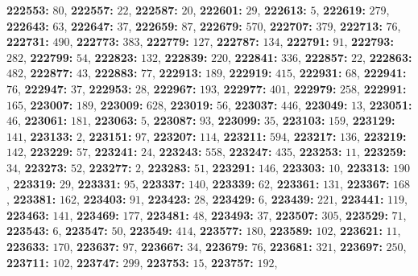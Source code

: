 \textsf{\bfseries 222553:} $80$, \textsf{\bfseries 222557:} $22$, \textsf{\bfseries 222587:} $20$, \textsf{\bfseries 222601:} $29$, \textsf{\bfseries 222613:} $5$, \textsf{\bfseries 222619:} $279$, \textsf{\bfseries 222643:} $63$, \textsf{\bfseries 222647:} $37$, \textsf{\bfseries 222659:} $87$, \textsf{\bfseries 222679:} $570$, \textsf{\bfseries 222707:} $379$, \textsf{\bfseries 222713:} $76$, \textsf{\bfseries 222731:} $490$, \textsf{\bfseries 222773:} $383$, \textsf{\bfseries 222779:} $127$, \textsf{\bfseries 222787:} $134$, \textsf{\bfseries 222791:} $91$, \textsf{\bfseries 222793:} $282$, \textsf{\bfseries 222799:} $54$, \textsf{\bfseries 222823:} $132$, \textsf{\bfseries 222839:} $220$, \textsf{\bfseries 222841:} $336$, \textsf{\bfseries 222857:} $22$, \textsf{\bfseries 222863:} $482$, \textsf{\bfseries 222877:} $43$, \textsf{\bfseries 222883:} $77$, \textsf{\bfseries 222913:} $189$, \textsf{\bfseries 222919:} $415$, \textsf{\bfseries 222931:} $68$, \textsf{\bfseries 222941:} $76$, \textsf{\bfseries 222947:} $37$, \textsf{\bfseries 222953:} $28$, \textsf{\bfseries 222967:} $193$, \textsf{\bfseries 222977:} $401$, \textsf{\bfseries 222979:} $258$, \textsf{\bfseries 222991:} $165$, \textsf{\bfseries 223007:} $189$, \textsf{\bfseries 223009:} $628$, \textsf{\bfseries 223019:} $56$, \textsf{\bfseries 223037:} $446$, \textsf{\bfseries 223049:} $13$, \textsf{\bfseries 223051:} $46$, \textsf{\bfseries 223061:} $181$, \textsf{\bfseries 223063:} $5$, \textsf{\bfseries 223087:} $93$, \textsf{\bfseries 223099:} $35$, \textsf{\bfseries 223103:} $159$, \textsf{\bfseries 223129:} $141$, \textsf{\bfseries 223133:} $2$, \textsf{\bfseries 223151:} $97$, \textsf{\bfseries 223207:} $114$, \textsf{\bfseries 223211:} $594$, \textsf{\bfseries 223217:} $136$, \textsf{\bfseries 223219:} $142$, \textsf{\bfseries 223229:} $57$, \textsf{\bfseries 223241:} $24$, \textsf{\bfseries 223243:} $558$, \textsf{\bfseries 223247:} $435$, \textsf{\bfseries 223253:} $11$, \textsf{\bfseries 223259:} $34$, \textsf{\bfseries 223273:} $52$, \textsf{\bfseries 223277:} $2$, \textsf{\bfseries 223283:} $51$, \textsf{\bfseries 223291:} $146$, \textsf{\bfseries 223303:} $10$, \textsf{\bfseries 223313:} $190$, \textsf{\bfseries 223319:} $29$, \textsf{\bfseries 223331:} $95$, \textsf{\bfseries 223337:} $140$, \textsf{\bfseries 223339:} $62$, \textsf{\bfseries 223361:} $131$, \textsf{\bfseries 223367:} $168$, \textsf{\bfseries 223381:} $162$, \textsf{\bfseries 223403:} $91$, \textsf{\bfseries 223423:} $28$, \textsf{\bfseries 223429:} $6$, \textsf{\bfseries 223439:} $221$, \textsf{\bfseries 223441:} $119$, \textsf{\bfseries 223463:} $141$, \textsf{\bfseries 223469:} $177$, \textsf{\bfseries 223481:} $48$, \textsf{\bfseries 223493:} $37$, \textsf{\bfseries 223507:} $305$, \textsf{\bfseries 223529:} $71$, \textsf{\bfseries 223543:} $6$, \textsf{\bfseries 223547:} $50$, \textsf{\bfseries 223549:} $414$, \textsf{\bfseries 223577:} $180$, \textsf{\bfseries 223589:} $102$, \textsf{\bfseries 223621:} $11$, \textsf{\bfseries 223633:} $170$, \textsf{\bfseries 223637:} $97$, \textsf{\bfseries 223667:} $34$, \textsf{\bfseries 223679:} $76$, \textsf{\bfseries 223681:} $321$, \textsf{\bfseries 223697:} $250$, \textsf{\bfseries 223711:} $102$, \textsf{\bfseries 223747:} $299$, \textsf{\bfseries 223753:} $15$, \textsf{\bfseries 223757:} $192$, 
